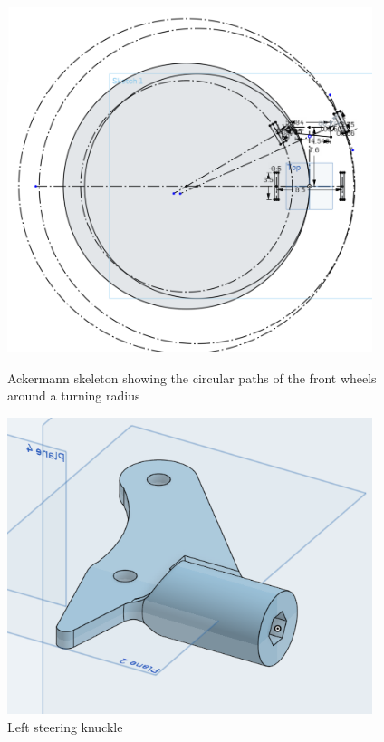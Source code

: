  

\begin{figure}[ht]
\centering
\begin{minipage}[b]{.48\textwidth}
  \centering
  \includegraphics[width=0.95\textwidth]{Meetings/September/09-28-22/9-28-22_CAD_Figure1.PNG}
  \caption{Ackermann skeleton showing the circular paths of the front wheels around a turning radius}
  \label{fig:pic1}
\end{minipage}%
\hfill%
\begin{minipage}[b]{.48\textwidth}
  \centering
  \includegraphics[width=0.95\textwidth]{Meetings/September/09-28-22/9-28-22_CAD_Figure2.PNG}
  \caption{Left steering knuckle}
  \label{fig:pic2}
\end{minipage}
\end{figure}

